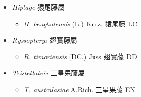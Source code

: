 
  \begin{itemize}
 \item[] \textit{Hiptage} 猿尾藤屬
                    
  \begin{itemize}
        \item[] \href{http://www.theplantlist.org/tpl1.1/search?q=Hiptage+benghalensis}{\textit{H. benghalensis} (L.) Kurz.}   猿尾藤 LC
  \end{itemize}
 \item[] \textit{Ryssopterys} 翅實藤屬
                    
  \begin{itemize}
        \item[] \href{http://www.theplantlist.org/tpl1.1/search?q=Ryssopterys+timoriensis}{\textit{R. timoriensis} (DC.) Juss}   翅實藤 DD
  \end{itemize}
 \item[] \textit{Tristellateia} 三星果藤屬
                    
  \begin{itemize}
        \item[] \href{http://www.theplantlist.org/tpl1.1/search?q=Tristellateia+australasiae}{\textit{T. australasiae} A.Rich.}   三星果藤 EN
  \end{itemize}
  \end{itemize}
